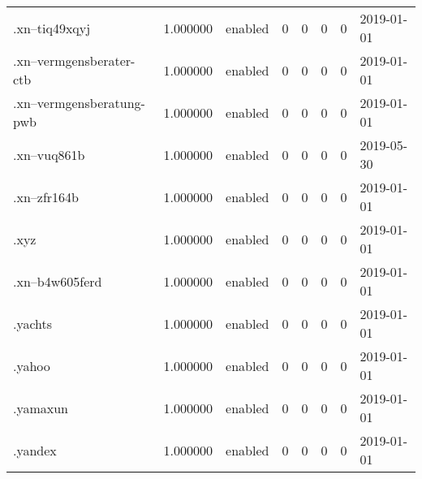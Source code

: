 \begin{tabular}{lrlrrrrl}
.xn--tiq49xqyj            &          1.000000 &         enabled &                           0 &                           0 &                           0 &                   0 &           2019-01-01 \\
.xn--vermgensberater-ctb  &          1.000000 &         enabled &                           0 &                           0 &                           0 &                   0 &           2019-01-01 \\
.xn--vermgensberatung-pwb &          1.000000 &         enabled &                           0 &                           0 &                           0 &                   0 &           2019-01-01 \\
.xn--vuq861b              &          1.000000 &         enabled &                           0 &                           0 &                           0 &                   0 &           2019-05-30 \\
.xn--zfr164b              &          1.000000 &         enabled &                           0 &                           0 &                           0 &                   0 &           2019-01-01 \\
.xyz                      &          1.000000 &         enabled &                           0 &                           0 &                           0 &                   0 &           2019-01-01 \\
.xn--b4w605ferd           &          1.000000 &         enabled &                           0 &                           0 &                           0 &                   0 &           2019-01-01 \\
.yachts                   &          1.000000 &         enabled &                           0 &                           0 &                           0 &                   0 &           2019-01-01 \\
.yahoo                    &          1.000000 &         enabled &                           0 &                           0 &                           0 &                   0 &           2019-01-01 \\
.yamaxun                  &          1.000000 &         enabled &                           0 &                           0 &                           0 &                   0 &           2019-01-01 \\
.yandex                   &          1.000000 &         enabled &                           0 &                           0 &                           0 &                   0 &           2019-01-01 \\

\end{tabular}
